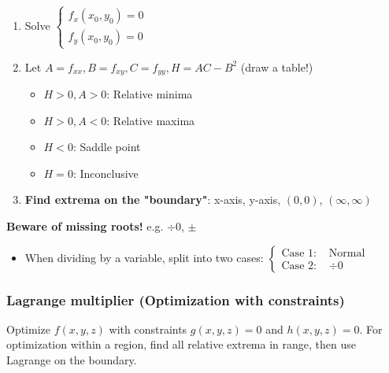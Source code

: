 \begin{mdframed}[style=theorem]
	\begin{enumerate}
		\item Solve $\begin{cases}f_x(x_0, y_0) = 0 \\ f_y(x_0, y_0) = 0\end{cases}$
		\item Let $A = f_{xx}, B = f_{xy}, C = f_{yy}, H = AC - B^2$ (draw a table!)
		\vspace{-0.5cm}
		\begin{multicols}{2}
			\begin{itemize}
				\item $H > 0, A > 0$: Relative minima
				\item $H > 0, A < 0$: Relative maxima
				\item $H < 0$: Saddle point
				\item $H = 0$: Inconclusive
			\end{itemize}
		\end{multicols}
		\vspace{-0.5cm}
		\item \textbf{Find extrema on the "boundary"}: x-axis, y-axis, $(0, 0)$, $(\infty, \infty)$
	\end{enumerate}
	\textbf{Beware of missing roots!} e.g. $\div 0$, $\pm$
	\begin{itemize}
		\item When dividing by a variable, split into two cases: $\begin{cases}\text{Case 1: } &\text{Normal}\\ \text{Case 2: } &\div 0\end{cases}$
	\end{itemize}
\end{mdframed}

\vfill\null
\columnbreak

\subsubsection*{Lagrange multiplier (Optimization with constraints)}
Optimize $f(x, y, z)$ with constraints $g(x, y, z)=0$ and $h(x, y, z)=0$. For optimization within a region, find all relative extrema in range, then use Lagrange on the boundary.

